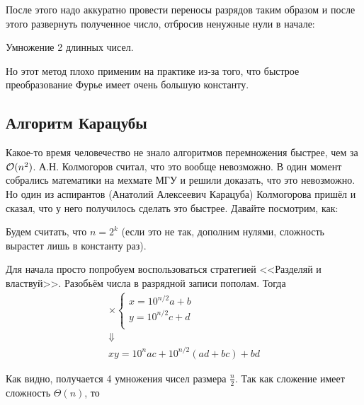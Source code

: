 \documentclass[a4paper, 12pt]{article}
\begin{document}
После этого надо аккуратно провести переносы разрядов таким образом и после этого
развернуть полученное число, отбросив ненужные нули в начале:

\begin{algorithm}
  \caption{Умножение 2 длинных чисел.}
  \begin{algorithmic}[1]
     
      \EndFor
    \EndFunction
  \end{algorithmic}
\end{algorithm}

Но этот метод плохо применим на практике из-за того, что быстрое преобразование
Фурье имеет очень большую константу.

\subsection{Алгоритм Карацубы}

Какое-то время человечество не знало алгоритмов перемножения быстрее, чем за
$\mathcal{O}(n^2)$. А.Н. Колмогоров считал, что это вообще невозможно. В один момент
собрались математики на мехмате МГУ и решили доказать, что это невозможно. Но
один из аспирантов (Анатолий Алексеевич Карацуба) Колмогорова пришёл и сказал, что у него получилось сделать
это быстрее. Давайте посмотрим, как:

Будем считать, что $n = 2^k$ (если это не так, дополним нулями, сложность вырастет лишь в константу раз).

Для начала просто попробуем воспользоваться стратегией <<Разделяй и властвуй>>. Разобьём числа в 
разрядной записи пополам. Тогда
\[\begin{array}{c}
\times \begin{cases}
x = 10^{n/2}a + b\\
y = 10^{n/2}c + d\\
\end{cases} \\
\Downarrow\\
xy = 10^{n}ac + 10^{n/2}(ad+bc)+bd
\end{array}\]

Как видно, получается 4 умножения чисел размера $\frac{n}{2}$. Так как сложение имеет сложность $\Theta(n)$, то
\end{document}
